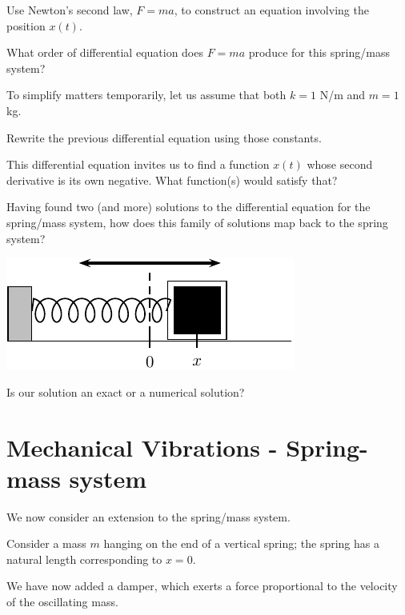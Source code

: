 \problem Use Newton's second law, $F = ma$, to construct an equation
involving the position $x(t)$.  \vfill

What order of differential equation does $F=ma$ produce for this
spring/mass system?

\vspace{1.3in}

\newpage

To simplify matters temporarily, let us assume that both
  $k = 1 $ N/m and $m = 1$ kg. 

  \problem Rewrite the previous differential equation using those
  constants.  \vspace{1.5in}

  This differential equation invites us to find a function $x(t)$
  whose second derivative is its own negative.  What function(s) would
  satisfy that?  \vfill

\newpage

\problem Having found two (and more) solutions to the differential
equation for the spring/mass system, how does this family of solutions
map back to the spring system?

\begin{center}
\includegraphics[width=0.4\linewidth]{graphics/notes_08_block}
\end{center}

\vfill

Is our solution an exact or a numerical solution?
\vspace{1.3in}


\newpage


\section*{Mechanical Vibrations - Spring-mass system}

We now consider an extension to the spring/mass system.

Consider a mass $m$ hanging on the end of a vertical spring; the
spring has a natural length corresponding to $x=0$.  

We have now added a damper, which exerts a force proportional to the
velocity of the oscillating mass.


